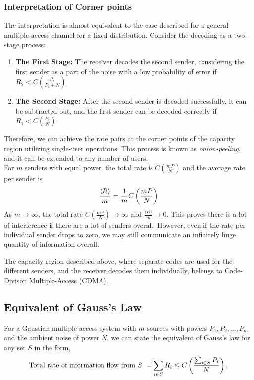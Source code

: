 \subsubsection*{Interpretation of Corner points}
The interpretation is almost equivalent to the case described for a general multiple-access channel for a fixed distribution. Consider the decoding as a two-stage process:
\begin{enumerate}
    \item  \textbf{The First Stage:} The receiver decodes the second sender, considering the first sender as a part of the noise with a low probability of error if $R_2 < C(\frac{P_2}{P_1+N})$.

    \item \textbf{The Second Stage:} After the second sender is decoded successfully, it can be subtracted out, and the first sender can be decoded correctly if $R_1 < C(\frac{P_1}{N})$. 
\end{enumerate}
%
Therefore, we can achieve the rate pairs at the corner points of the capacity region utilizing single-user operations. This process is known as \textit{onion-peeling}, and it can be extended to any number of users. \\ 
For $m$ senders with equal power, the total rate is $C(\frac{mP}{N})$ and the average rate per sender is 
%
\begin{eqnarray}
    \frac{\langle R \rangle}{m}= \frac{1}{m}C\left(\frac{mP}{N}\right)
\end{eqnarray}
%
As $m \rightarrow \infty$, the total rate $C(\frac{mP}{N}) \rightarrow \infty$ and $\frac{\langle R \rangle}{m} \rightarrow 0$. This proves there is a lot of interference if there are a lot of senders overall. However, even if the rate per individual sender drops to zero, we may still communicate an infinitely huge quantity of information overall.
%
\begin{tcolorbox}[enhanced,
  colback=green!0!black!0!white,colframe=black!15!blue,title=\textbf{Code-Divison Multiple-Access (CDMA)}]
The capacity region described above, where separate codes are used for the different senders, and the receiver decodes them individually, belongs to Code-Divison Multiple-Access (CDMA).
\end{tcolorbox}
%

\subsection{Equivalent of Gauss's Law}
For a Gaussian multiple-access system with $m$ sources with powers $P_1, P_2,..., P_m$ and the ambient noise of power $N$, we can state the equivalent of Gauss's law for any set $S$ in the form,
%
\begin{eqnarray}
    \text{Total rate of information flow from $S$ } = \sum_{i \in S}R_i \leq C\left(\frac{\sum_{i\in S} P_i }{N}\right). 
\end{eqnarray}
